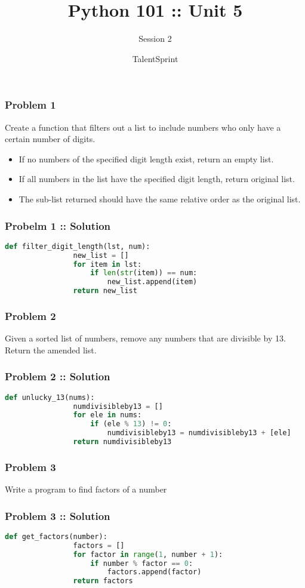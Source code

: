 \documentclass[14pt]{beamer}
\title{Python 101 :: Unit 5}
\subtitle{Session 2}
\date{}
\author[TS]{TalentSprint}
\begin{document}
    \begin{frame}
        \titlepage
    \end{frame}
    \begin{frame}
        \frametitle{Problem 1}
        \alert{Create a function that filters out a list to include numbers who only have a certain number of digits.}
        \begin{itemize}
            \item If no numbers of the specified digit length exist, return an empty list.
            \item If all numbers in the list have the specified digit length, return original list.
            \item The sub-list returned should have the same relative order as the original list.
        \end{itemize}
    \end{frame}
    \begin{frame}[containsverbatim]
        \frametitle{Probelm 1 :: Solution}
        \begin{lstlisting}[language=Python]
            def filter_digit_length(lst, num):
                new_list = []
                for item in lst:
                    if len(str(item)) == num:
                        new_list.append(item)
                return new_list
        \end{lstlisting}
    \end{frame}

    \begin{frame}
        \frametitle{Problem 2}
        \alert{Given a sorted list of numbers, remove any numbers that are divisible by 13. Return the amended list.}
    \end{frame}

    \begin{frame}[containsverbatim]
        \frametitle{Problem 2 :: Solution}
        \begin{lstlisting}[language=Python]
            def unlucky_13(nums):
                numdivisibleby13 = []
                for ele in nums:
                    if (ele % 13) != 0:
                        numdivisibleby13 = numdivisibleby13 + [ele]
                return numdivisibleby13
        \end{lstlisting}
    \end{frame}

    \begin{frame}
        \frametitle{Problem 3}
        \alert{Write a program to find factors of a number}
    \end{frame}

    \begin{frame}[containsverbatim]
        \frametitle{Problem 3 :: Solution}
        \begin{lstlisting}[language=Python]
            def get_factors(number):
                factors = []
                for factor in range(1, number + 1):
                    if number % factor == 0:
                        factors.append(factor)
                return factors
        \end{lstlisting}
    \end{frame}
\end{document}
